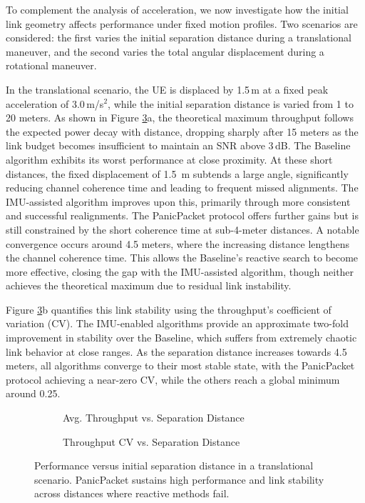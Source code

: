 \documentclass[fleqn,10pt]{wlscirep}
\begin{document}
To complement the analysis of acceleration, we now investigate how the initial link geometry affects performance under fixed motion profiles. Two scenarios are considered: the first varies the initial separation distance during a translational maneuver, and the second varies the total angular displacement during a rotational maneuver.

In the translational scenario, the UE is displaced by 1.5\,m at a fixed peak acceleration of 3.0\,m/s$^2$, while the initial separation distance is varied from 1 to 20 meters. As shown in Figure \ref{fig:distance_effects}a, the theoretical maximum throughput follows the expected power decay with distance, dropping sharply after 15 meters as the link budget becomes insufficient to maintain an SNR above 3\,dB. The Baseline algorithm exhibits its worst performance at close proximity. At these short distances, the fixed displacement of 1.5 \,m subtends a large angle, significantly reducing channel coherence time and leading to frequent missed alignments. The IMU-assisted algorithm improves upon this, primarily through more consistent and successful realignments. The PanicPacket protocol offers further gains but is still constrained by the short coherence time at sub-4-meter distances. A notable convergence occurs around 4.5 meters, where the increasing distance lengthens the channel coherence time. This allows the Baseline's reactive search to become more effective, closing the gap with the IMU-assisted algorithm, though neither achieves the theoretical maximum due to residual link instability.

Figure \ref{fig:distance_effects}b quantifies this link stability using the throughput's coefficient of variation (CV). The IMU-enabled algorithms provide an approximate two-fold improvement in stability over the Baseline, which suffers from extremely chaotic link behavior at close ranges. As the separation distance increases towards 4.5 meters, all algorithms converge to their most stable state, with the PanicPacket protocol achieving a near-zero CV, while the others reach a global minimum around 0.25.

\begin{figure}[h!]
    \centering
    \begin{subfigure}{0.495\linewidth}
        
        \vspace{-25 pt}
        \caption{Avg. Throughput vs. Separation Distance}
        \label{fig:dist_rate}
    \end{subfigure}
    \hfill
    \begin{subfigure}{0.495\linewidth}
        
        \vspace{-25 pt}
        \caption{Throughput CV vs. Separation Distance}
        \label{fig:dist_cov}
    \end{subfigure}
    \caption{Performance versus initial separation distance in a translational scenario. PanicPacket sustains high performance and link stability across distances where reactive methods fail.}
    \label{fig:distance_effects}
\end{figure}
\end{document}
